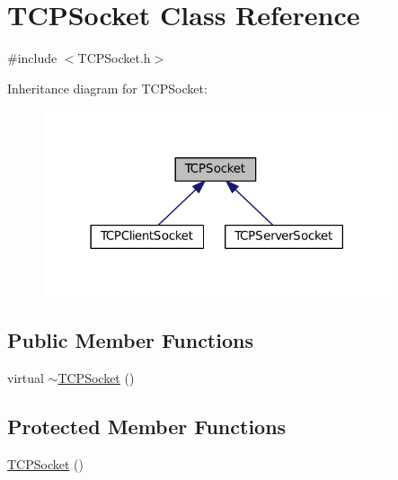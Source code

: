 \hypertarget{classTCPSocket}{\section{T\+C\+P\+Socket Class Reference}
\label{classTCPSocket}
}


{\ttfamily \#include $<$T\+C\+P\+Socket.\+h$>$}



Inheritance diagram for T\+C\+P\+Socket\+:
\nopagebreak
\begin{figure}[H]
\begin{center}
\leavevmode
\includegraphics[width=290pt]{classTCPSocket__inherit__graph}
\end{center}
\end{figure}
\subsection*{Public Member Functions}
\begin{DoxyCompactItemize}
\item 
virtual \hyperlink{classTCPSocket_af357e6923a0f8adbbb8e46fab4523991}{$\sim$\+T\+C\+P\+Socket} ()
\end{DoxyCompactItemize}
\subsection*{Protected Member Functions}
\begin{DoxyCompactItemize}
\item 
\hyperlink{classTCPSocket_a7a50427a401d1a6f3209d51818bad901}{T\+C\+P\+Socket} ()
\end{DoxyCompactItemize}
